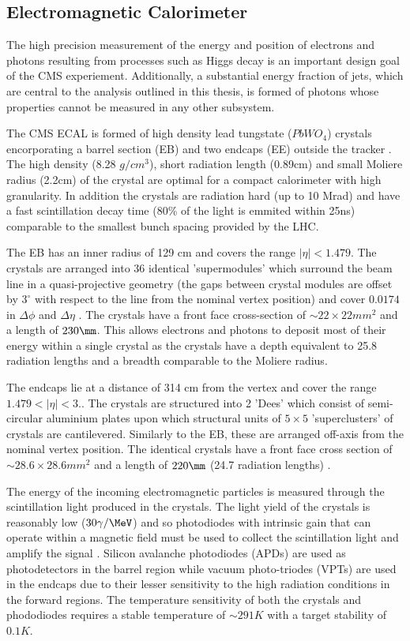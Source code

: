 \subsection{Electromagnetic Calorimeter}

The high precision measurement of the energy and position of electrons and photons resulting from 
processes such as Higgs decay is an important design goal of the CMS experiement. Additionally,
a substantial energy fraction of jets, which are central to the analysis outlined in this
thesis, is formed of photons whose properties cannot be measured in any other subsystem.

The CMS ECAL is formed of high density lead tungstate ($PbWO_4$) crystals encorporating a barrel section (EB) 
and two endcaps (EE) outside the tracker \cite{ecal_tdr}. The high density (8.28 $g/cm^3$), short radiation length (0.89cm) 
and small Moliere radius (2.2cm) of the crystal are optimal for a compact calorimeter with high granularity. In addition the 
crystals are radiation hard (up to 10 Mrad) and have a fast scintillation decay time (80\% of the light is emmited within 25ns)
comparable to the smallest bunch spacing provided by the LHC. 

The EB has an inner radius of 129 cm and covers the range $|\eta| < 1.479$. The crystals are arranged into 36 
identical 'supermodules' which surround the beam line in a quasi-projective geometry (the gaps between
crystal modules are offset by $3^\circ$ with respect to the line from the nominal vertex position)
and cover $0.0174$ in $\Delta\phi$ and $\Delta\eta$ \cite{CMS}. The crystals have a front face cross-section 
of $\sim 22\times22mm^2$ and a length of $230\mm$. This allows electrons and photons to deposit most of their  
energy within a single crystal as the crystals have a depth equivalent to 25.8 radiation lengths and 
a breadth comparable to the Moliere radius. 

The endcaps lie at a distance of 314 cm from the vertex and cover the range $1.479 < |\eta| < 3.$. The crystals
are structured into 2 'Dees' which consist of semi-circular aluminium plates upon which structural units of 
$5\times5$ 'superclusters' of crystals are cantilevered. Similarly to the EB, these are arranged off-axis from
the nominal vertex position. The identical crystals have a front face cross section of 
$\sim 28.6\times28.6 mm^2$ and a length of $220\mm$ (24.7 radiation lengths) \cite{CMS}.

The energy of the incoming electromagnetic particles is measured through the scintillation light produced
in the crystals. The light yield of the crystals is reasonably low ($30\gamma/\MeV$)
and so photodiodes with intrinsic gain that can operate within a magnetic field must be used to collect 
the scintillation light and amplify the signal \cite{ecal_tdr}. Silicon avalanche photodiodes (APDs) are used as photodetectors
in the barrel region while vacuum photo-triodes (VPTs) are used in the endcaps due to their lesser sensitivity
to the high radiation conditions in the forward regions. The temperature sensitivity of both the crystals 
and phododiodes requires a stable temperature of $\sim291K$ with a target stability of $0.1K$. 

